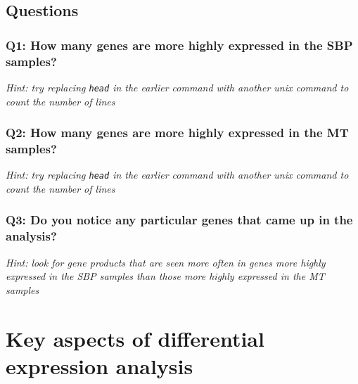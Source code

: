 \documentclass[11pt]{article}
\begin{document}
    \hypertarget{questions}{%
\subsection{Questions}\label{questions}}

    \hypertarget{q1-how-many-genes-are-more-highly-expressed-in-the-sbp-samples}{%
\subsubsection{Q1: How many genes are more highly expressed in the SBP
samples?}\label{q1-how-many-genes-are-more-highly-expressed-in-the-sbp-samples}}

\textit{Hint: try replacing \texttt{head} in the earlier command with
another unix command to count the number of lines}

\hypertarget{q2-how-many-genes-are-more-highly-expressed-in-the-mt-samples}{%
\subsubsection{Q2: How many genes are more highly expressed in the MT
samples?}\label{q2-how-many-genes-are-more-highly-expressed-in-the-mt-samples}}

\textit{Hint: try replacing \texttt{head} in the earlier command with
another unix command to count the number of lines}

\hypertarget{q3-do-you-notice-any-particular-genes-that-came-up-in-the-analysis}{%
\subsubsection{Q3: Do you notice any particular genes that came up in
the
analysis?}\label{q3-do-you-notice-any-particular-genes-that-came-up-in-the-analysis}}

\textit{Hint: look for gene products that are seen more often in genes
more highly expressed in the SBP samples than those more highly
expressed in the MT samples}





\newpage





    \hypertarget{key-aspects-of-differential-expression-analysis}{%
\section{Key aspects of differential expression
analysis}\label{key-aspects-of-differential-expression-analysis}}
\end{document}
